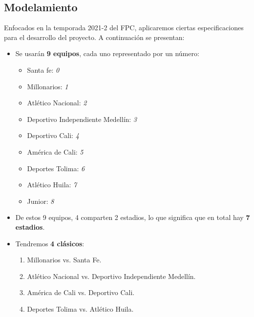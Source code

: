 \documentclass[11pt]{article}
\begin{document}
\begin{multicols}{2}
        \section{Modelamiento}
            Enfocados en la temporada 2021-2 del FPC, aplicaremos ciertas especificaciones para el desarrollo del proyecto. A continuación se presentan:
            \begin{itemize}
                \item  Se usarán \textbf{9 equipos}, cada uno representado por un número:
                \begin{itemize}[label=$\diamond$]
                    \item Santa fe: \textit{0}
                    \item Millonarios: \textit{1}
                    \item Atlético Nacional: \textit{2}
                    \item Deportivo Independiente Medellín: \textit{3}
                    \item Deportivo Cali: \textit{4}
                    \item América de Cali: \textit{5}
                    \item Deportes Tolima: \textit{6}
                    \item Atlético Huila: \textit{7}
                    \item Junior: \textit{8}
                \end{itemize}  
                \item  De estos 9 equipos, 4 comparten 2 estadios, lo que significa que en total hay \textbf{7 estadios}.
                \item  Tendremos \textbf{4 clásicos}:
                \begin{enumerate}
                    \item  Millonarios vs. Santa Fe.
                    \item  Atlético Nacional vs. Deportivo Independiente Medellín.
                    \item  América de Cali vs. Deportivo Cali.
                    \item  Deportes Tolima  vs. Atlético Huila.
                \end{enumerate}
            \end{itemize}


\end{multicols}
\end{document}
